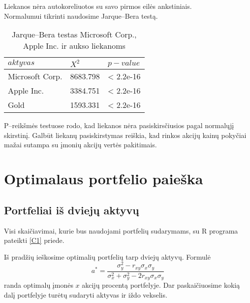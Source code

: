 \documentclass[12pt, a14paper, lithuanian]{article}
\begin{document}
Liekanos nėra autokoreliuotos su savo pirmos eilės ankstiniais.\\

Normalumui tikrinti naudosime Jarque--Bera testą.



\begin{table}[ht]
\begin{center}
    \begin{tabular}{ | l | l | l | }
    \hline
    $ aktyvas $ &  $ X^2 $  & $ p-value $  \\
    \hline
	Microsoft Corp. & 8683.798 & < 2.2e-16\\
	Apple Inc. & 3384.751 & < 2.2e-16\\
	Gold & 1593.331 & < 2.2e-16\\
	\hline
    \end{tabular}
\end{center}
\caption{Jarque--Bera testas Microsoft Corp., Apple Inc. ir aukso liekanoms}
\end{table}

P--reikšmės testuose rodo, kad liekanos nėra pasiskirsčiusios pagal normalųjį skirstinį. Galbūt liekanų pasiskirstymas
reiškia, kad rinkos akcijų kainų pokyčiai mažai sutampa su įmonių akcijų vertės pakitimais.
\newpage
\section{Optimalaus portfelio paieška}   




















\subsection{Portfeliai iš dviejų aktyvų}

Visi skaičiavimai, kurie bus naudojami portfelių sudarymams, su R programa pateikti \ref{C1} priede.
 
Iš pradžių ieškosime optimalių portfelių tarp dviejų aktyvų. Formulė ~\cite{cope} $$a^{\ast}= \frac{\sigma_y^2 - r_{xy}\sigma_x \sigma_y}{\sigma^2_x + \sigma^2_y - 2r_{xy}\sigma_x \sigma_y}$$
randa optimalų įmonės $x$ akcijų procentą portfelyje. Dar paskaičiuosime kokią dalį portfelyje turėtų sudaryti aktyvas ir iždo vekselis. \\
\end{document}
